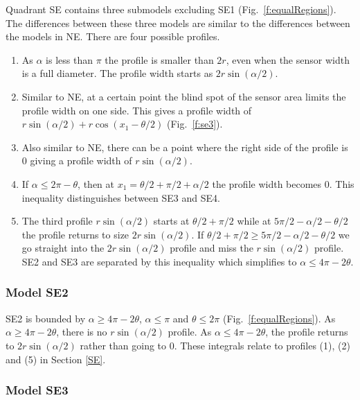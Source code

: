 Quadrant SE contains three submodels excluding SE1  (Fig.~\ref{f:equalRegions}). The differences between these three models are similar to the differences between the models in NE. There are four possible profiles.
\begin{enumerate}
\item As $\alpha$ is less than $\pi$ the profile is smaller than $2r$, even when the sensor width is a full diameter. The profile width starts as $2r\sin(\alpha/2)$.
\item Similar to NE, at a certain point the blind spot of the sensor area limits the profile width on one side. This gives a profile width of $r\sin(\alpha/2) + r\cos(x_1 - \theta/2)$ (Fig.~\ref{f:se3}).
\item Also similar to NE, there can be a point where the right side of the profile is 0 giving a profile width of $r\sin(\alpha/2)$. 
\item If $\alpha \le 2\pi - \theta$, then at $x_1 = \theta/2 + \pi/2 + \alpha/2 $ the profile width becomes 0. This inequality distinguishes between SE3 and SE4. 
\item The third profile $r\sin(\alpha/2)$ starts at $\theta/2 + \pi/2$ while at $5\pi/2 - \alpha/2 - \theta/2$ the profile returns to size $2r\sin(\alpha/2)$. If $\theta/2 + \pi/2 \ge 5\pi/2 - \alpha/2 - \theta/2$ we go straight into the  $2r\sin(\alpha/2)$ profile and miss the $r\sin(\alpha/2)$ profile.  SE2 and SE3 are separated by this inequality which simplifies to $\alpha \le 4\pi - 2\theta$. 

\end{enumerate}





\subsubsection{Model SE2} \label{SE2}

SE2 is bounded by $\alpha \ge 4\pi - 2\theta$, $\alpha \le \pi$ and $\theta \le 2\pi$ (Fig.~\ref{f:equalRegions}). As $\alpha \ge 4\pi - 2\theta$, there is no $r\sin(\alpha/2)$ profile. As $\alpha \le 4\pi - 2\theta$, the profile returns to $2r\sin(\alpha/2)$ rather than going to 0. These integrals relate to profiles (1), (2) and (5) in Section \ref{SE}.




\subsubsection{Model SE3} \label{SE3}

